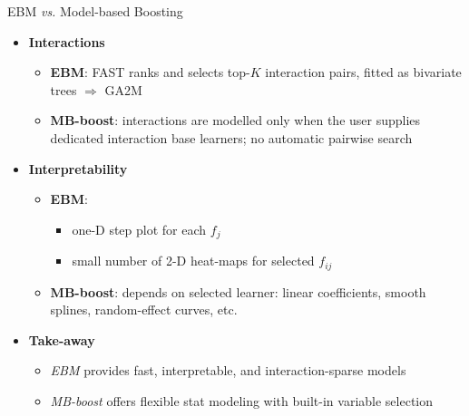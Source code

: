 \documentclass[10pt,compress,t,notes=noshow, xcolor=table]{beamer}
\begin{document}
\begin{frame}{EBM \textit{vs.} Model-based Boosting}
\small
\begin{itemize}
  \item \textbf{Interactions}
        \begin{itemize}
          \item \textbf{EBM}: FAST ranks and selects top-$K$ interaction pairs, fitted as bivariate trees $\Rightarrow$ GA2M  
          \item \textbf{MB-boost}: interactions are modelled only when the
                user supplies dedicated interaction base learners;
                no automatic pairwise search
        \end{itemize}
\pause
  \item \textbf{Interpretability}
        \begin{itemize}
          \item \textbf{EBM}:
          \begin{itemize}
              \item one-D step plot for each $f_{j}$
              \item small number of 2-D heat-maps for selected $f_{ij}$
          \end{itemize} 
          \item \textbf{MB-boost}: depends on selected learner: linear
                coefficients, smooth splines, random-effect curves, etc. %
        \end{itemize}
\pause
  \item \textbf{Take-away}  
  \begin{itemize}
      \item \emph{EBM} provides fast, interpretable, and interaction-sparse models
      \item \emph{MB-boost} offers flexible stat modeling with built-in variable selection %
  \end{itemize}
\end{itemize}
\end{frame}


\endlecture
\end{document}
